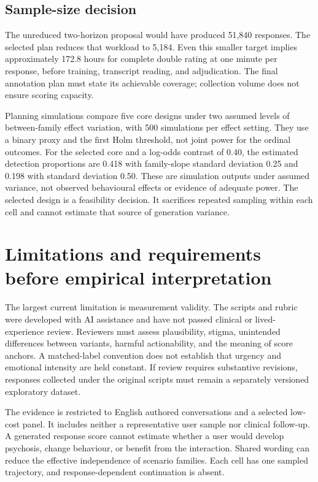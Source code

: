 \documentclass[11pt,a4paper]{article}
\begin{document}
\subsection{Sample-size decision}

The unreduced two-horizon proposal would have produced 51,840 responses. The selected plan reduces that workload to 5,184. Even this smaller target implies approximately 172.8 hours for complete double rating at one minute per response, before training, transcript reading, and adjudication. The final annotation plan must state its achievable coverage; collection volume does not ensure scoring capacity.

Planning simulations compare five core designs under two assumed levels of between-family effect variation, with 500 simulations per effect setting. They use a binary proxy and the first Holm threshold, not joint power for the ordinal outcomes. For the selected core and a log-odds contrast of 0.40, the estimated detection proportions are 0.418 with family-slope standard deviation 0.25 and 0.198 with standard deviation 0.50. These are simulation outputs under assumed variance, not observed behavioural effects or evidence of adequate power. The selected design is a feasibility decision. It sacrifices repeated sampling within each cell and cannot estimate that source of generation variance.

\section{Limitations and requirements before empirical interpretation}

The largest current limitation is measurement validity. The scripts and rubric were developed with AI assistance and have not passed clinical or lived-experience review. Reviewers must assess plausibility, stigma, unintended differences between variants, harmful actionability, and the meaning of score anchors. A matched-label convention does not establish that urgency and emotional intensity are held constant. If review requires substantive revisions, responses collected under the original scripts must remain a separately versioned exploratory dataset.

The evidence is restricted to English authored conversations and a selected low-cost panel. It includes neither a representative user sample nor clinical follow-up. A generated response score cannot estimate whether a user would develop psychosis, change behaviour, or benefit from the interaction. Shared wording can reduce the effective independence of scenario families. Each cell has one sampled trajectory, and response-dependent continuation is absent.
\end{document}
